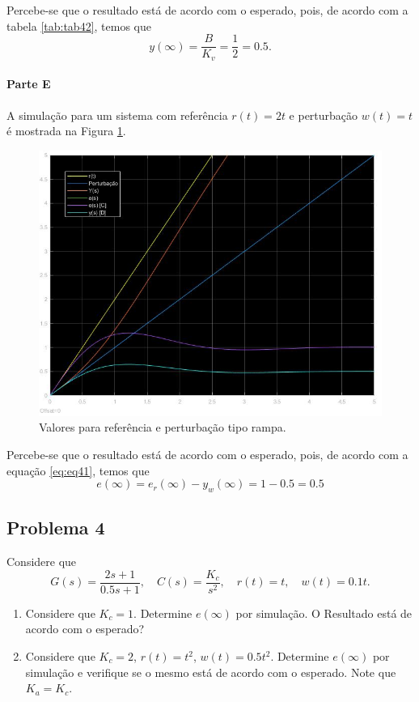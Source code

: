 \documentclass[
]{book}
\providecommand{\tightlist}{%
  \setlength{\itemsep}{0pt}\setlength{\parskip}{0pt}}
\begin{document}
Percebe-se que o resultado está de acordo com o esperado, pois, de acordo com a tabela \ref{tab:tab42}, temos que
\[
y(\infty) = \frac {B}{K_v} = \frac {1}{2} = 0.5.
\]

\hypertarget{parte-e}{%
\paragraph*{Parte E}\label{parte-e}}

A simulação para um sistema com referência \(r(t) = 2t\) e perturbação \(w(t) = t\) é mostrada na Figura \ref{fig:fig43E1}.

\begin{figure}
\includegraphics[width=0.8\linewidth]{Imagens/Lab4/Resolução/prob3E1} \caption{Valores para referência e perturbação tipo rampa.}\label{fig:fig43E1}
\end{figure}

Percebe-se que o resultado está de acordo com o esperado, pois, de acordo com a equação \eqref{eq:eq41}, temos que
\[
e(\infty) = e_r(\infty) - y_w(\infty) = 1 - 0.5 = 0.5
\]

\hypertarget{problema-4}{%
\subsection*{Problema 4}\label{problema-4}}

Considere que
\[
G(s) = \frac {2s +1}{0.5s+1}, \quad C(s) = \frac {K_c}{s^2}, \quad r(t) = t, \quad w(t) = 0.1t.
\]

\begin{enumerate}
\def\labelenumi{\alph{enumi}.}
\tightlist
\item
  Considere que \(K_c =1\). Determine \(e(\infty)\) por simulação. O Resultado está de acordo com o esperado?
\item
  Considere que \(K_c =2\), \(r(t) = t^2\), \(w(t) = 0.5t^2\). Determine \(e(\infty)\) por simulação e verifique se o mesmo está de acordo com o esperado. Note que \(K_a = K_c\).
\end{enumerate}
\end{document}
